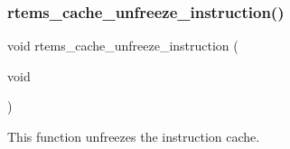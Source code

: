 \subsubsection{\texorpdfstring{rtems\_cache\_unfreeze\_instruction()}{rtems\_cache\_unfreeze\_instruction()}}
{\footnotesize\ttfamily void rtems\+\_\+cache\+\_\+unfreeze\+\_\+instruction (\begin{DoxyParamCaption}\item[{void}]{ }\end{DoxyParamCaption})}

This function unfreezes the instruction cache. 
